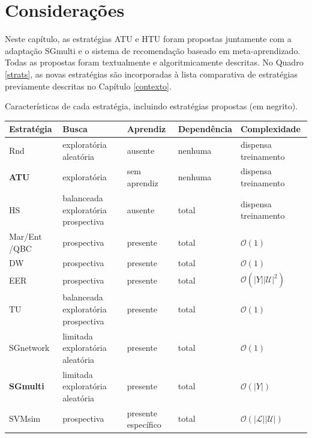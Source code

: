 % 

\section{Considerações}
Neste capítulo, as estratégias ATU e HTU foram propostas juntamente com a adaptação SGmulti e o sistema de recomendação baseado em meta-aprendizado.
Todas as propostas foram textualmente e algoritmicamente descritas.
No Quadro \ref{strats}, as novas estratégias são incorporadas à lista comparativa de estratégias previamente descritas no Capítulo \ref{contexto}.
\begin{quadro}
\caption[Características de cada estratégia, incluindo propostas.]{Características de cada estratégia, incluindo estratégias propostas (em negrito).}
\label{strats}
\centering
\begin{threeparttable}
\begin{tabular}{|l|p{3cm}|p{2cm}|l|p{3.2cm}|}
\hline
\textbf{Estratégia}		& \textbf{Busca}		&\textbf{Aprendiz}  & \textbf{Dependência}		&\textbf{Complexidade}  \\ \hline
Rnd\tnote{a}			& {exploratória aleatória} 		& ausente			& nenhuma							&dispensa treinamento  \\ \hline
\textbf{ATU}\tnote{k}			&{exploratória}		& sem aprendiz				& nenhuma 							&dispensa treinamento  \\ \hline
HS\tnote{b}			&{balanceada exploratória prospectiva}	& ausente		& total							&dispensa treinamento\tnote{*}  \\ \hline
Mar/Ent\tnote{a} /QBC\tnote{c}	& prospectiva					& presente		& total							&$\mathcal{O}(1)$  \\ \hline
DW\tnote{d}			& prospectiva					& presente		& total							&$\mathcal{O}(1)$  \\ \hline
EER\tnote{e}			& prospectiva					& presente	& total							&$\mathcal{O}(|Y||\mathcal{U}|^2)$  \\ \hline
TU\tnote{f}			&{balanceada exploratória prospectiva}	& presente		& total							&$\mathcal{O}(1)$  \\ \hline
SGnetwork\tnote{g}		&{limitada exploratória aleatória}	& presente			& total							&$\mathcal{O}(1)$  \\ \hline
\textbf{SGmulti}\tnote{g}		&{limitada exploratória aleatória}	& presente			& total							&$\mathcal{O}(|Y|)$  \\ \hline
SVMsim\tnote{h}			& prospectiva					&{presente \phantom{oooo} específico}	& total							&$\mathcal{O}(|\mathcal{L}||\mathcal{U}|)$  \\ \hline

\end{tabular}
\end{threeparttable}
\end{quadro}
